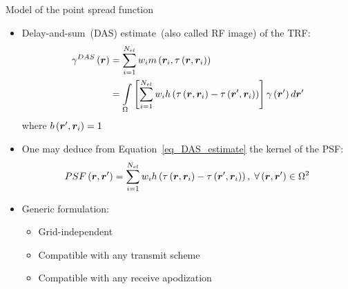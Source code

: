 {\begin{block}{Model of the point spread function}
	\begin{itemize}
		\item Delay-and-sum~(DAS) estimate~(also called RF image) of the TRF:
		\begin{align}
		\label{eq_DAS_estimate}
			\gamma^{DAS} \left(\bm{r}\right) &= \sum \limits_{i=1}^{N_{el}} w_i m \left(\bm{r}_i, \tau \left(\bm{r}, \bm{r}_i\right)\right) \nonumber \\
			&= \int \limits_{\Omega} \left[\sum \limits_{i=1}^{N_{el}} w_i h \left(\tau \left(\bm{r}, \bm{r}_i\right) - \tau \left(\bm{r}', \bm{r}_i\right) \right)\right] \gamma\left(\bm{r}'\right) d \bm{r}'
		\end{align}
		where $b \left(\bm{r}', \bm{r}_i\right) = 1$
		\item One may deduce from Equation~\eqref{eq_DAS_estimate} 
		the kernel of the PSF:
		\begin{equation}
			\label{eq_PSF_estimate}
			PSF \left(\bm{r}, \bm{r}'\right) = \sum \limits_{i=1}^{N_{el}} w_i h \left(\tau \left(\bm{r}, \bm{r}_i\right) - \tau \left(\bm{r}', \bm{r}_i\right) \right), \; \forall \left(\bm{r}, \bm{r}'\right) \in \Omega^2
		\end{equation}
		\item Generic formulation:
		\begin{itemize}
			\item Grid-independent
			\item Compatible with any transmit scheme
			\item Compatible with any receive apodization 
		\end{itemize}
	\end{itemize}
\end{block}
\vfill


}
